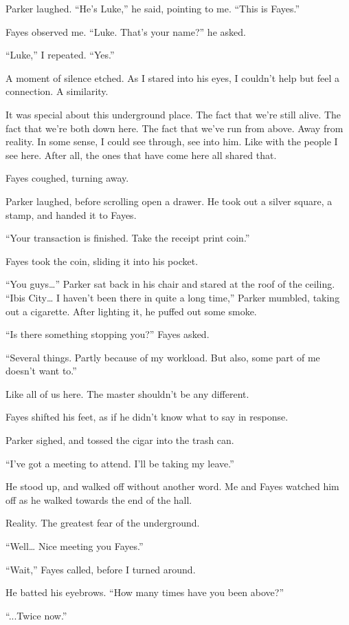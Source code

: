 Parker laughed. “He’s Luke,” he said, pointing to me. “This is Fayes.”

Fayes observed me. “Luke. That’s your name?” he asked.

“Luke,” I repeated. “Yes.”

A moment of silence etched. As I stared into his eyes, I couldn’t help but feel a connection. A similarity.

It was special about this underground place. The fact that we’re still alive. The fact that we’re both down here. The fact that we’ve run from above. Away from reality. In some sense, I could see through, see into him. Like with the people I see here. After all, the ones that have come here all shared that.

Fayes coughed, turning away.

Parker laughed, before scrolling open a drawer. He took out a silver square, a stamp, and handed it to Fayes.

“Your transaction is finished. Take the receipt print coin.”

Fayes took the coin, sliding it into his pocket.

“You guys…” Parker sat back in his chair and stared at the roof of the ceiling. “Ibis City… I haven’t been there in quite a long time,” Parker mumbled, taking out a cigarette. After lighting it, he puffed out some smoke.

“Is there something stopping you?” Fayes asked.

“Several things. Partly because of my workload. But also, some part of me doesn’t want to.”

Like all of us here. The master shouldn’t be any different.

Fayes shifted his feet, as if he didn’t know what to say in response.

Parker sighed, and tossed the cigar into the trash can.

 “I’ve got a meeting to attend. I’ll be taking my leave.”

He stood up, and walked off without another word. Me and Fayes watched him off as he walked towards the end of the hall.

Reality. The greatest fear of the underground.

“Well… Nice meeting you Fayes.”

“Wait,” Fayes called, before I turned around.

He batted his eyebrows. “How many times have you been above?”

 “...Twice now.”

